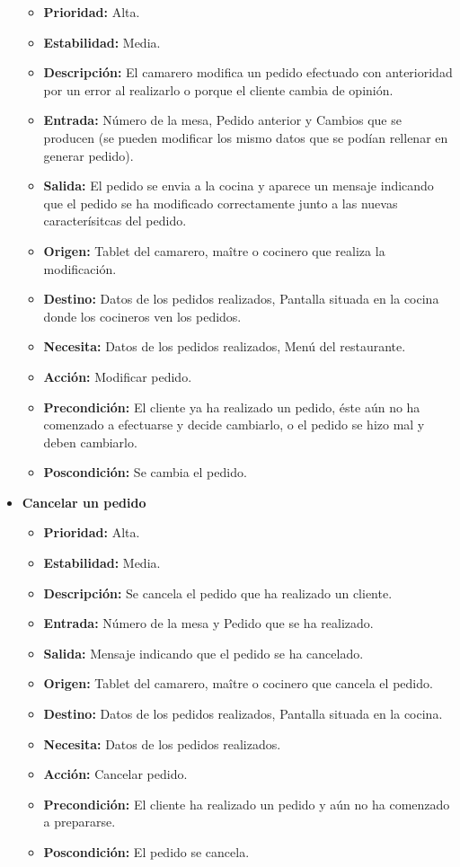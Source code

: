\documentclass[spanish,a4paper,11pt, twoside]{report}	%
\begin{document}
\begin{itemize}
		\begin{itemize}
			\item \textbf{Prioridad: } Alta.
			\item \textbf{Estabilidad: } Media.
			\item \textbf{Descripción: } El camarero modifica un pedido efectuado con anterioridad por un error al realizarlo o porque el cliente cambia de opinión.
			\item \textbf{Entrada: }Número de la mesa, Pedido anterior y Cambios que se producen (se pueden modificar los mismo datos que se podían rellenar en generar pedido).
			\item \textbf{Salida: }  El pedido se envia a la cocina y aparece un mensaje indicando que el pedido se ha modificado correctamente junto a las nuevas caracterísitcas del pedido.
			\item \textbf{Origen: } Tablet del camarero, maître o cocinero que realiza la modificación.
			\item \textbf{Destino: } Datos de los pedidos realizados, Pantalla situada en la cocina donde los cocineros ven los pedidos.
			\item \textbf{Necesita: } Datos de los pedidos realizados, Menú del restaurante.
			\item \textbf{Acción: } Modificar pedido.
			\item \textbf{Precondición: } El cliente ya ha realizado un pedido, éste aún no ha comenzado a efectuarse y decide cambiarlo, o el pedido se hizo mal y deben cambiarlo.
			\item \textbf{Poscondición: } Se cambia el pedido.

		\end{itemize}%

	\item \textbf{Cancelar un pedido} %

		\begin{itemize}
			\item \textbf{Prioridad: } Alta.
			\item \textbf{Estabilidad: } Media.
			\item \textbf{Descripción: } Se cancela el pedido que ha realizado un cliente.
			\item \textbf{Entrada: } Número de la mesa y Pedido que se ha realizado.
			\item \textbf{Salida: } Mensaje indicando que el pedido se ha cancelado.
			\item \textbf{Origen: } Tablet del camarero, maître o cocinero que cancela el pedido.
			\item \textbf{Destino: } Datos de los pedidos realizados, Pantalla situada en la cocina.
			\item \textbf{Necesita: } Datos de los pedidos realizados.
			\item \textbf{Acción: } Cancelar pedido.
			\item \textbf{Precondición: } El cliente ha realizado un pedido y aún no ha comenzado a prepararse.
			\item \textbf{Poscondición: } El pedido se cancela.


\end{itemize}
\end{itemize}
\end{document}
